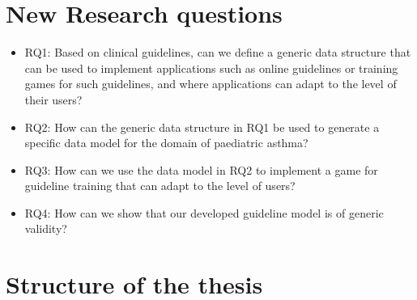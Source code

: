 \section{New Research questions}
\begin{itemize}
	\item RQ1: Based on clinical guidelines, can we define a generic data structure that can be used to implement applications such as online guidelines or training games for such guidelines, and where applications can adapt to the level of their users?
	\item RQ2: How can the generic data structure in RQ1 be used to generate a specific data model for the domain of paediatric asthma?
	\item RQ3: How can we use the data model in RQ2 to implement a game for guideline training that can adapt to the level of users?
	\item RQ4: How can we show that our developed guideline model is of generic validity?
\end{itemize}
\section{Structure of the thesis}